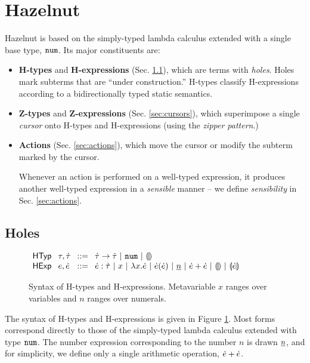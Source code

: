 \documentclass{llncs}
\begin{document}
\section{Hazelnut}
Hazelnut is based on the simply-typed lambda calculus extended with a single base type, $\texttt{num}$. Its major constituents are:
\begin{itemize}
\item \textbf{H-types} and \textbf{H-expressions} (Sec. \ref{sec:holes}), which are terms with \emph{holes}. Holes mark subterms that are ``under construction.'' H-types classify H-expressions according to a {bidirectionally typed} static semantics.
\item \textbf{Z-types} and \textbf{Z-expressions} (Sec. \ref{sec:cursors}), which superimpose a single \emph{cursor} onto H-types and H-expressions (using the \emph{zipper pattern}.)
\item \textbf{Actions} (Sec. \ref{sec:actions}), which move the cursor or modify the subterm marked by the cursor.

Whenever an action is performed on a well-typed expression, it produces another well-typed expression in a \emph{sensible} manner -- we define \emph{sensibility} in Sec. \ref{sec:actions}.
\end{itemize}

\subsection{Holes}\label{sec:holes}
\begin{figure}
$\arraycolsep=4pt\begin{array}{lllllll}
\mathsf{HTyp} & \tau,\htau & ::= &
  \tarr{\htau}{\htau} ~\vert~
  \tnum ~\vert~
  \tehole\\
\mathsf{HExp} & e,\hexp & ::= &
  \hexp : \htau ~\vert~
  x ~\vert~
  \hlam{x}{\hexp} ~\vert~
  \hap{\hexp}{\hexp} ~\vert~
  \hnum{n} ~\vert~
  \hadd{\hexp}{\hexp} ~\vert~
  \hehole ~\vert~
  \hhole{\hexp}
\end{array}$
\caption{Syntax of H-types and H-expressions. Metavariable $x$ ranges over variables and $n$ ranges over numerals.}
\label{fig:hexp-syntax}
\end{figure}

The syntax of H-types and H-expressions is given in Figure \ref{fig:hexp-syntax}. Most forms correspond directly to those of the simply-typed lambda calculus extended with type $\texttt{num}$. The number expression corresponding to the number $n$ is drawn $\underline{n}$, and for simplicity, we define only a single arithmetic operation, $\dot{e} + \dot{e}$.
\end{document}
